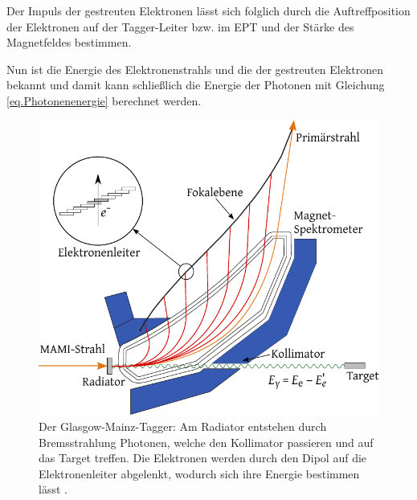 \documentclass[a4paper,11pt,oneside,final,german,openbib,pdftex]{scrbook}
\begin{document}
{ %

Der Impuls der gestreuten Elektronen l\"asst sich folglich durch die Auftreffposition der Elektronen auf der Tagger-Leiter bzw. im EPT und der St\"arke des Magnetfeldes bestimmen. 
 
 Nun ist die Energie des Elektronenstrahls und die der gestreuten Elektronen bekannt und damit kann schlie{\ss}lich die Energie der Photonen mit Gleichung \ref{eq.Photonenenergie} berechnet werden.
\newline 
\begin{figure}[h!]
	\begin{center}
	\includegraphics{TAGGER-New}
	
	\caption[Prinzip des Glasgow-Mainz-Taggers]{Der Glasgow-Mainz-Tagger: Am Radiator entstehen durch Bremsstrahlung Photonen, welche den Kollimator passieren und auf das Target treffen. Die Elektronen werden durch den Dipol auf die Elektronenleiter abgelenkt, wodurch sich ihre Energie bestimmen lässt \cite{Un08}.}
\label{fig.TAGGER}	
\end{center}
\end{figure}
 
}
\end{document}
